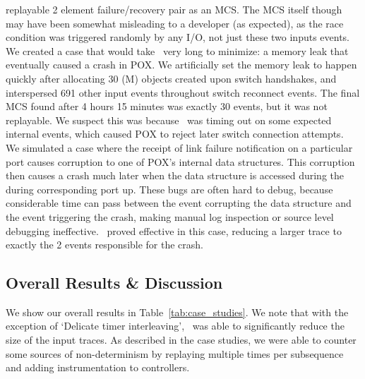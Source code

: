 replayable 2 element failure/recovery pair as an MCS.
The MCS itself though may have been somewhat misleading to a developer (as
expected), as the race condition
was triggered randomly by any I/O, not just these two
inputs events.\\[0.5ex]
%
We created a case that would take \projectname~very long to minimize: a
memory leak that eventually caused a crash in POX. We artificially set the
memory leak to happen quickly after allocating 30 (M) objects created upon switch
handshakes, and interspersed 691 other input events throughout switch reconnect
events. The final MCS found after 4 hours 15 minutes was exactly 30 events, but it
was not replayable. We suspect this was because \projectname~was timing out on
some expected internal events, which caused POX to reject later switch
connection attempts.\\[0.5ex]
%
We simulated a case where the receipt of
link failure notification on a particular port causes corruption to one of
POX's internal data
structures. This corruption then causes a crash much later when the data structure is
accessed during the during corresponding port up. These bugs
are often hard to debug, because considerable time can pass between the event
corrupting the data structure and the event triggering the crash, making
manual log inspection or source level debugging ineffective.
\projectname~proved effective in this case, reducing a larger trace to
exactly the 2 events responsible for the crash.

\subsection{Overall Results \& Discussion}

We show our overall results in
Table~\ref{tab:case_studies}. We note that with the exception of `Delicate timer
interleaving', \projectname~was able to significantly reduce the size of the
input traces. As described in the case studies, we were able to
counter some sources of non-determinism
by replaying multiple times per subsequence and adding instrumentation to
controllers.


